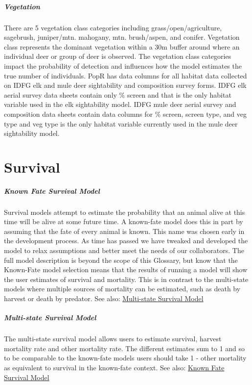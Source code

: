 \documentclass[
]{book}
\begin{document}
\hypertarget{gl-veg}{%
\subparagraph*{Vegetation}\label{gl-veg}}

There are 5 vegetation class categories including grass/open/agriculture, sagebrush, juniper/mtn. mahogany, mtn. brush/aspen, and conifer. Vegetation class represents the dominant vegetation within a 30m buffer around where an individual deer or group of deer is observed. The vegetation class categories impact the probability of detection and influences how the model estimates the true number of individuals. PopR has data columns for all habitat data collected on IDFG elk and mule deer sightability and composition survey forms. IDFG elk aerial survey data sheets contain only \% screen and that is the only habitat variable used in the elk sightability model. IDFG mule deer aerial survey and composition data sheets contain data columns for \% screen, screen type, and veg type and veg type is the only habitat variable currently used in the mule deer sightability model.

\hypertarget{gl-surv}{%
\section{Survival}\label{gl-surv}}

\hypertarget{gl-known-fate}{%
\subparagraph*{Known Fate Survival Model}\label{gl-known-fate}}

Survival models attempt to estimate the probability that an animal alive at this time will be alive at some future time. A known-fate model does this in part by assuming that the fate of every animal is known. This name was chosen early in the development process. As time has passed we have tweaked and developed the model to relax assumptions and better meet the needs of our collaborators. The full model description is beyond the scope of this Glossary, but know that the Known-Fate model selection means that the results of running a model will show the user estimates of survival and mortality. This is in contrast to the multi-state models where multiple sources of mortality can be estimated, such as death by harvest or death by predator. See also: \protect\hyperlink{gl-multi-state}{Multi-state Survival Model}

\hypertarget{gl-multi-state}{%
\subparagraph*{Multi-state Survival Model}\label{gl-multi-state}}

The multi-state survival model allows users to estimate survival, harvest mortality rate and other mortality rate. The different estimates sum to 1 and so to be comparable to the known-fate models users should take 1 - other mortality as equivalent to survival in the known-fate context. See also: \protect\hyperlink{gl-known-fate}{Known Fate Survival Model}
\end{document}
